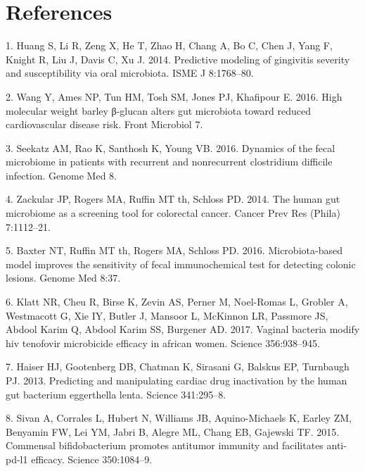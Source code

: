 \documentclass[11pt,]{article}
\begin{document}
\newpage

\section*{References}\label{references}

\hypertarget{refs}{}
\hypertarget{ref-Huang_gingivitis_2014}{}
1. Huang S, Li R, Zeng X, He T, Zhao H, Chang A, Bo C, Chen J, Yang F,
Knight R, Liu J, Davis C, Xu J. 2014. Predictive modeling of gingivitis
severity and susceptibility via oral microbiota. ISME J 8:1768--80.

\hypertarget{ref-Wang_cvdrisk_2016}{}
2. Wang Y, Ames NP, Tun HM, Tosh SM, Jones PJ, Khafipour E. 2016. High
molecular weight barley β-glucan alters gut microbiota toward reduced
cardiovascular disease risk. Front Microbiol 7.

\hypertarget{ref-Seekatz_cdiff_2016}{}
3. Seekatz AM, Rao K, Santhosh K, Young VB. 2016. Dynamics of the fecal
microbiome in patients with recurrent and nonrecurrent clostridium
difficile infection. Genome Med 8.

\hypertarget{ref-zackular_CRC_2014}{}
4. Zackular JP, Rogers MA, Ruffin MT th, Schloss PD. 2014. The human gut
microbiome as a screening tool for colorectal cancer. Cancer Prev Res
(Phila) 7:1112--21.

\hypertarget{ref-baxter_FIT_2016}{}
5. Baxter NT, Ruffin MT th, Rogers MA, Schloss PD. 2016.
Microbiota-based model improves the sensitivity of fecal immunochemical
test for detecting colonic lesions. Genome Med 8:37.

\hypertarget{ref-Klatt_microbicide_2017}{}
6. Klatt NR, Cheu R, Birse K, Zevin AS, Perner M, Noel-Romas L, Grobler
A, Westmacott G, Xie IY, Butler J, Mansoor L, McKinnon LR, Passmore JS,
Abdool Karim Q, Abdool Karim SS, Burgener AD. 2017. Vaginal bacteria
modify hiv tenofovir microbicide efficacy in african women. Science
356:938--945.

\hypertarget{ref-Haiser_cardiac_2013}{}
7. Haiser HJ, Gootenberg DB, Chatman K, Sirasani G, Balskus EP,
Turnbaugh PJ. 2013. Predicting and manipulating cardiac drug
inactivation by the human gut bacterium eggerthella lenta. Science
341:295--8.

\hypertarget{ref-Sivan_cancer_2015}{}
8. Sivan A, Corrales L, Hubert N, Williams JB, Aquino-Michaels K, Earley
ZM, Benyamin FW, Lei YM, Jabri B, Alegre ML, Chang EB, Gajewski TF.
2015. Commensal bifidobacterium promotes antitumor immunity and
facilitates anti-pd-l1 efficacy. Science 350:1084--9.
\end{document}
